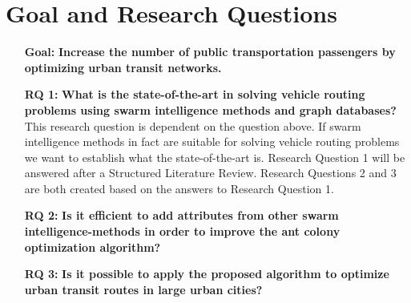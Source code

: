\section{Goal and Research Questions}

\begin{itemize}
\item[\textbf{Goal:}] \label{itm:goal} \textbf{Increase the number of public transportation passengers by optimizing urban transit networks.}
\end{itemize}

\begin{itemize}

    \item[\textbf{RQ 1:}]\label{itm:RQ1} \textbf{What is the state-of-the-art in solving vehicle routing problems using swarm intelligence methods and graph databases?}\newline
    This research question is dependent on the question above. If swarm intelligence methods in fact are suitable for solving vehicle routing problems we want to establish what the state-of-the-art is.
    Research Question 1 will be answered after a Structured Literature Review\citep{kofod2014}. Research Questions 2 and 3 are both created based on the answers to Research Question 1. 

    \item[\textbf{RQ 2:}]\label{itm:RQ2} \textbf{Is it efficient to add attributes from other swarm intelligence-methods in order to improve the ant colony optimization algorithm?}

    \item[\textbf{RQ 3:}]\label{itm:RQ3}\textbf{Is it possible to apply the proposed algorithm to optimize urban transit routes in large urban cities?}

\end{itemize}



